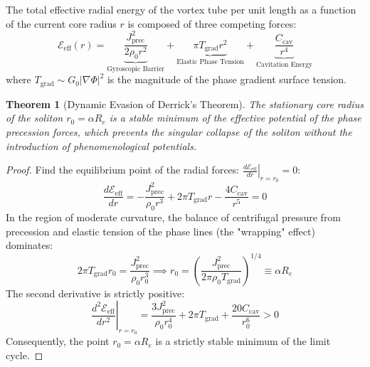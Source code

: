\documentclass[12pt,a4paper]{article}
\newtheorem{theorem}{Theorem}
\begin{document}
	The total effective radial energy of the vortex tube per unit length as a function of the current core radius $r$ is composed of three competing forces:
	\begin{equation}
		\mathcal{E}_{\text{eff}}(r) = \underbrace{\frac{J_{\text{prec}}^2}{2 \rho_0 r^2}}_{\text{Gyroscopic Barrier}} + \underbrace{\pi T_{\text{grad}} r^2}_{\text{Elastic Phase Tension}} + \underbrace{\frac{C_{\text{cav}}}{r^4}}_{\text{Cavitation Energy}}
	\end{equation}
	where $T_{\text{grad}} \sim G_0 |\nabla \Phi|^2$ is the magnitude of the phase gradient surface tension.
	
	\begin{theorem}[Dynamic Evasion of Derrick's Theorem]
		The stationary core radius of the soliton $r_0 = \alpha R_e$ is a stable minimum of the effective potential of the phase precession forces, which prevents the singular collapse of the soliton without the introduction of phenomenological potentials.
	\end{theorem}
	
	\begin{proof}
		Find the equilibrium point of the radial forces: $\left. \frac{d\mathcal{E}_{\text{eff}}}{dr} \right|_{r=r_0} = 0$:
		\begin{equation}
			\frac{d\mathcal{E}_{\text{eff}}}{dr} = -\frac{J_{\text{prec}}^2}{\rho_0 r^3} + 2\pi T_{\text{grad}} r - \frac{4 C_{\text{cav}}}{r^5} = 0
		\end{equation}
		In the region of moderate curvature, the balance of centrifugal pressure from precession and elastic tension of the phase lines (the "wrapping" effect) dominates:
		\begin{equation}
			2\pi T_{\text{grad}} r_0 = \frac{J_{\text{prec}}^2}{\rho_0 r_0^3} \implies r_0 = \left( \frac{J_{\text{prec}}^2}{2\pi \rho_0 T_{\text{grad}}} \right)^{1/4} \equiv \alpha R_e
		\end{equation}
		The second derivative is strictly positive:
		\begin{equation}
			\left. \frac{d^2\mathcal{E}_{\text{eff}}}{dr^2} \right|_{r=r_0} = \frac{3 J_{\text{prec}}^2}{\rho_0 r_0^4} + 2\pi T_{\text{grad}} + \frac{20 C_{\text{cav}}}{r_0^6} > 0
		\end{equation}
		Consequently, the point $r_0 = \alpha R_e$ is a strictly stable minimum of the limit cycle.
	\end{proof}
	
\end{document}
